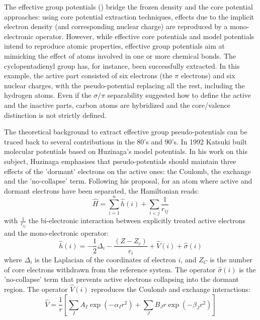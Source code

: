 \documentclass[aip]{revtex4-1}
\begin{document}
The effective group potentials (\showCustomItem) bridge the frozen density and the core potential
approaches: using core potential extraction techniques, effects due to the implicit 
electron density (and corresponding nuclear charge) 
are reproduced by a mono-electronic operator.\cite{carissan_what_2006, raynaud_multicentered_2010}
However, while effective core potentials and model potentials intend to 
reproduce atomic properties,
effective group potentials aim at mimicking the effect of atoms involved in one or more chemical
bonds. The cyclopentadienyl group has, for instance, been successfully extracted.\cite{carissan_what_2006}
In this example, the active part consisted of six electrons (the $\pi$ electrons) and six
nuclear charges, with the pseudo-potential replacing all the rest, including the hydrogen atoms.
Even if the $\sigma / \pi$ separability suggested how to define the active and the inactive parts,
carbon atoms are hybridized and the core/valence distinction is not 
strictly defined.

The theoretical background to extract effective group pseudo-potentials  can be traced back 
to several contributions in the 80's and  90's.\cite{Nicolas1980a, huzinaga_effective_1991, huzinaga_1994_1995, EGP5, EGP6, EGP9}
In 1992 Katsuki built molecular potentials based on Huzinaga's model potentials.\cite{katsuki_molecular_1992,katsuki_spectral_1993}
 In his work on this subject, Huzinaga emphasises that pseudo-potentials should maintain three effects of the
'dormant' electrons on the active ones: the Coulomb, the exchange and the 'no-collapse' term.\cite{huzinaga_effective_1991}
Following his proposal, for an atom where active and dormant electrons have been separated, the Hamiltonian reads:
\begin{equation}
\label{eq:atomicHamiltonian}
\hat{H} = \sum_{i=1}^n \hat{h}(i) +\sum_{i<j}\frac{1}{r_{ij}}
\end{equation}
with $\frac{1}{r_{ij}}$ the bi-electronic interaction
between explicitly treated active electrons and
the mono-electronic operator:
\begin{equation}
\label{eq:monoElectronicOperator}
\hat{h}(i) = -\frac{1}{2}\Delta_i - \frac{(Z-Z_c)}{r_i}+\hat{V}(i) + \hat{\sigma}(i)
\end{equation}
where $\Delta_i$ is the Laplacian of the coordinates of electron $i$, and 
$Z_C$ is the number of core electrons withdrawn from the reference system.
The operator $\hat{\sigma}(i)$ is the 'no-collapse' term that prevents active electrons
collapsing into the dormant region. The operator $\hat{V}(i)$ reproduces the 
Coulomb and exchange interactions:
\begin{equation}
\label{eq:HuzinagaMPVersion1Potential}
\hat{V} = \frac{1}{r}\left[\sum_IA_I\exp(-\alpha_I r^2)+\sum_JB_Jr\exp(-\beta_J r^2)\right]
\end{equation}
\end{document}
